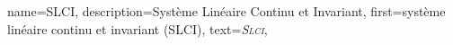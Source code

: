 {%
  name={SLCI},%
  description={Système Linéaire Continu et Invariant},%
  first={système linéaire continu et invariant (SLCI)},%
  text={\emph{{\scshape Slci}}},%
}
